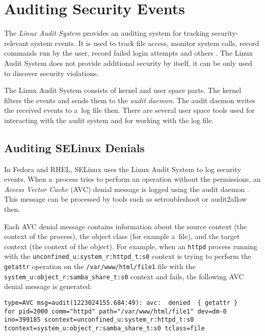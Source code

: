 \section{Auditing Security Events}

The \emph{Linux Audit System} provides an auditing system for tracking
security-relevant system events. It is used to track file access, monitor system
calls, record commands run by the user, record failed login attempts and others
\cite{secguide}. The Linux Audit System does not provide additional security by
itself, it can be only used to discover security violations.

The Linux Audit System consists of kernel and user space parts. The kernel
filters the events and sends them to the \emph{audit daemon}. The audit daemon
writes the received events to a~log file then. There are several user space
tools used for interacting with the audit system and for working with the log
file.

\subsection{Auditing SELinux Denials}

In Fedora and RHEL, SELinux uses the Linux Audit System to log security events.
When a~process tries to perform an operation without the permissions, an
\emph{Access Vector Cache} (AVC) denial message is logged using the audit daemon
\cite{selinuxguide}. This message can be processed by tools such as
setroubleshoot or audit2allow then.

Each AVC denial message contains information about the source context (the
context of the process), the object class (for example a~file), and the target
context (the context of the object). For example, when an \texttt{httpd} process
running with the \texttt{unconfined\_u:system\_r:\allowbreak httpd\_t:s0}
context is trying to perform the \texttt{getattr} operation on the
\texttt{/var/www/html/\allowbreak file1} file with the
\texttt{system\_u:object\_r:samba\_share\_t:s0} context and fails, the following
AVC denial message is generated:

\begin{lstlisting}
type=AVC msg=audit(1223024155.684:49): avc:  denied  { getattr }
for pid=2000 comm="httpd" path="/var/www/html/file1" dev=dm-0
ino=399185 scontext=unconfined_u:system_r:httpd_t:s0
tcontext=system_u:object_r:samba_share_t:s0 tclass=file
\end{lstlisting}

